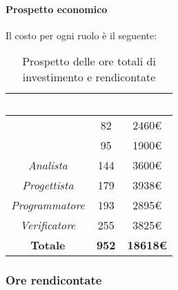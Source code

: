 \paragraph{Prospetto economico}
Il costo per ogni ruolo è il seguente:
\begin{table}[H]
	\begin{center}
		\begin{tabular}{ |c c c| }
		\rowcolor{darkblue} 
		\textcolor{white}{\textbf{Ruolo}} & \textcolor{white}{\textbf{Ore}} & \textcolor{white}{\textbf{Costo}} \\ \hline
		\textit{\Responsabile} 	& 82 & 2460€ \\ \hline
		\textit{\Amministratore} 	& 95 	& 1900€ \\ \hline
		\textit{Analista} 		& 144 	& 3600€ \\ \hline
		\textit{Progettista} 	& 179 	& 3938€ \\ \hline
		\textit{Programmatore}  	& 193 	& 2895€ \\ \hline
		\textit{Verificatore} 	& 255 	& 3825€ \\ \hline
		\textbf{Totale} & \textbf{952} & \textbf{18618€} \\  \hline
		\end{tabular}
	\caption{ Prospetto delle ore totali di investimento e rendicontate}
	\end{center}
\end{table}
\subsubsection{Ore rendicontate}
